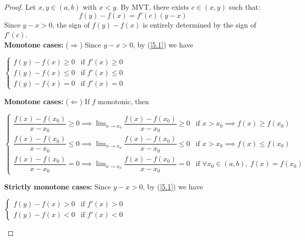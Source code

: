 \documentclass[
	UTF-8,
	11pt, %
	a4paper, %
]{LegrandOrangeBook}
\begin{document}
    \begin{proof}
    Let $x, y \in (a, b)$ with $x < y$. By MVT, there exists $c \in (x, y)$ such that:
    \begin{equation}\label{5.1}
        f(y) - f(x) = f'(c)(y - x)
    \end{equation}
    Since $y - x > 0$, the sign of $f(y) - f(x)$ is entirely determined by the sign of $f'(c)$.\\

    \textbf{Monotone cases:} ($\Rightarrow$) Since $y-x > 0$, by (\ref{5.1}) we have
    \begin{center}
            $
    \begin{cases}
        f(y) - f(x) \geq 0 & \text{if $f'(x) \ge 0$} \\[1ex]
        f(y) - f(x) \leq 0 & \text{if $f'(x) \le 0$} \\[1ex]
        f(y) - f(x) = 0 & \text{if $f'(x) = 0$}
    \end{cases}
    $
    \end{center}

    \textbf{Monotone cases:} ($\Leftarrow$) If $f$ monotonic, then
    \begin{center}
    $
    \begin{cases}
        \dfrac{f(x) - f(x_0)}{x-x_0} \geq 0 \implies \displaystyle\lim_{x \to x_0} \dfrac{f(x) - f(x_0)}{x-x_0} \geq 0 & \text{if $x > x_0 \implies f(x) \geq f(x_0)$}  \\[2ex]
        \dfrac{f(x) - f(x_0)}{x-x_0} \leq 0 \implies \displaystyle\lim_{x \to x_0} \dfrac{f(x) - f(x_0)}{x-x_0} \leq 0 &  \text{if $x > x_0 \implies f(x) \leq f(x_0)$}  \\[2ex]
        \dfrac{f(x) - f(x_0)}{x-x_0} = 0 \implies \displaystyle\lim_{x \to x_0} \dfrac{f(x) - f(x_0)}{x-x_0} = 0 & \text{if $\forall x_0 \in (a,b),\ f(x) = f(x_0)$}
    \end{cases}
    $
    \end{center}

    \textbf{Strictly monotone cases:} Since $y-x > 0$, by (\ref{5.1}) we have
    \begin{center}
    $
    \begin{cases}
        f(y) - f(x) > 0 & \text{if $f'(x) > 0$} \\
        f(y) - f(x) < 0 & \text{if $f'(x) < 0$} 
    \end{cases}
    $
    \end{center}
    \end{proof}
\end{document}

